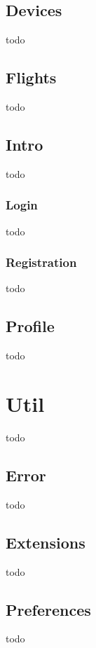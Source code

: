 \subsection{Devices}\label{subsec:devices}
todo

\subsection{Flights}\label{subsec:flights}
todo

\subsection{Intro}\label{subsec:intro}
todo

\subsubsection{Login}
todo

\subsubsection{Registration}
todo

\subsection{Profile}\label{subsec:profile}
todo

\section{Util}\label{sec:util}
todo

\subsection{Error}\label{subsec:error}
todo

\subsection{Extensions}\label{subsec:extensions}
todo

\subsection{Preferences}\label{subsec:preferences}
todo
